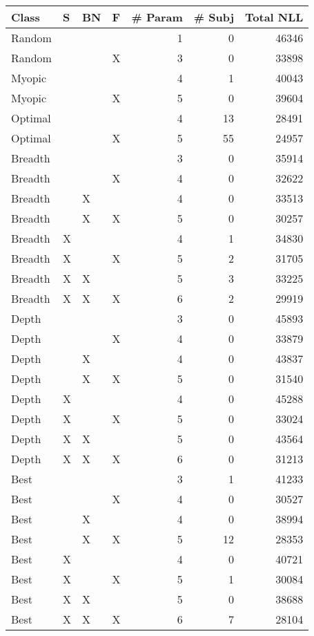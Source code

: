 \begin{tabular}{llllrrr}
\toprule
   Class &  S & BN &  F &  \# Param &  \# Subj &  Total NLL \\
\midrule
  Random &    &    &    &        1 &       0 &      46346 \\
  Random &    &    &  X &        3 &       0 &      33898 \\
  Myopic &    &    &    &        4 &       1 &      40043 \\
  Myopic &    &    &  X &        5 &       0 &      39604 \\
 Optimal &    &    &    &        4 &      13 &      28491 \\
 Optimal &    &    &  X &        5 &      55 &      24957 \\
 Breadth &    &    &    &        3 &       0 &      35914 \\
 Breadth &    &    &  X &        4 &       0 &      32622 \\
 Breadth &    &  X &    &        4 &       0 &      33513 \\
 Breadth &    &  X &  X &        5 &       0 &      30257 \\
 Breadth &  X &    &    &        4 &       1 &      34830 \\
 Breadth &  X &    &  X &        5 &       2 &      31705 \\
 Breadth &  X &  X &    &        5 &       3 &      33225 \\
 Breadth &  X &  X &  X &        6 &       2 &      29919 \\
   Depth &    &    &    &        3 &       0 &      45893 \\
   Depth &    &    &  X &        4 &       0 &      33879 \\
   Depth &    &  X &    &        4 &       0 &      43837 \\
   Depth &    &  X &  X &        5 &       0 &      31540 \\
   Depth &  X &    &    &        4 &       0 &      45288 \\
   Depth &  X &    &  X &        5 &       0 &      33024 \\
   Depth &  X &  X &    &        5 &       0 &      43564 \\
   Depth &  X &  X &  X &        6 &       0 &      31213 \\
    Best &    &    &    &        3 &       1 &      41233 \\
    Best &    &    &  X &        4 &       0 &      30527 \\
    Best &    &  X &    &        4 &       0 &      38994 \\
    Best &    &  X &  X &        5 &      12 &      28353 \\
    Best &  X &    &    &        4 &       0 &      40721 \\
    Best &  X &    &  X &        5 &       1 &      30084 \\
    Best &  X &  X &    &        5 &       0 &      38688 \\
    Best &  X &  X &  X &        6 &       7 &      28104 \\
\bottomrule
\end{tabular}
\unskip